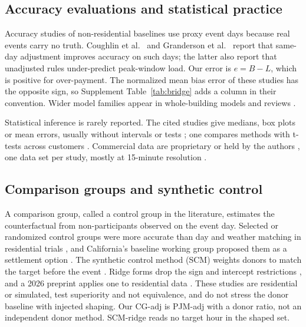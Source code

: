 \subsection{Accuracy evaluations and statistical practice}\label{sec:background:accuracy}

Accuracy studies of non-residential baselines use proxy event days because real events carry no truth. Coughlin et al.\ \citep{coughlin2009} and Granderson et al.\ \citep{granderson2021} report that same-day adjustment improves accuracy on such days; the latter also report that unadjusted rules under-predict peak-window load. Our error is $e=B-L$, which is positive for over-payment. The normalized mean bias error of these studies \citep{granderson2016} has the opposite sign, so Supplement Table~\ref{tab:bridge} adds a column in their convention. Wider model families appear in whole-building models and reviews \citep{granderson2015,valentini2022,malhotra2024}.

Statistical inference is rarely reported. The cited studies give medians, box plots or mean errors, usually without intervals or tests \citep{granderson2021,hatton2016,lee2019}; one compares methods with t-tests across customers \citep{wang2018spm}. Commercial data are proprietary or held by the authors \citep{granderson2021,mathieu2011cdc}, one data set per study, mostly at 15-minute resolution \citep{coughlin2009,mathieu2011}.

\subsection{Comparison groups and synthetic control}\label{sec:background:donors}

A comparison group, called a control group in the literature, estimates the counterfactual from non-participants observed on the event day. Selected or randomized control groups were more accurate than day and weather matching in residential trials \citep{hatton2016,wang2018spm,lee2019}, and California's baseline working group proposed them as a settlement option \citep{caiso_bawg2017}. The synthetic control method (SCM) weights donors to match the target before the event \citep{abadie2010,abadie2021}. Ridge forms drop the sign and intercept restrictions \citep{benmichael2021,doudchenko2016}, and a 2026 preprint applies one to residential data \citep{sievers2026}. These studies are residential or simulated, test superiority and not equivalence, and do not stress the donor baseline with injected shaping. Our CG-adj is PJM-adj with a donor ratio, not an independent donor method. SCM-ridge reads no target hour in the shaped set.

